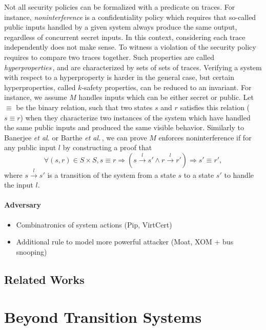 \documentclass[oneside,a4paper]{memoir}
\theoremstyle{break}
\begin{document}
Not all security policies can be formalized with a predicate on traces.
%
For instance, \emph{noninterference}  is a confidentiality policy
which requires that so-called public inputs handled by a given system always
produce the same output, regardless of concurrent secret inputs.
%
In this context, considering each trace independently does not make sense.
%
To witness a violation of the security policy requires to compare two traces
together.
%
Such properties are called \emph{hyperproperties}\,\cite{marr2002hypertheading},
and are characterized by sets of sets of traces.
%
Verifying a system with respect to a hyperproperty is harder in the general
case, but certain hyperproperties, called \( k \)-safety properties, can be
reduced to an invariant.
%
For instance, we assume \( M \) handles inputs which can be either secret or
public.
%
Let \( \equiv \) be the binary relation, such that two states \( s \) and
\( r \) satisfies this relation (\( s \equiv r \)) when they characterize two
instances of the system which have handled the same public inputs and produced
the same visible behavior.
%
Similarly to Banerjee \emph{et al.}  or Barthe \emph{et al.}\,\cite{barthe2011virtcert1},
we can prove \( M \) enforces noninterference if for any public input \( l \) by
constructing a proof that
%
\[
  \forall (s, r) \in S \times S, s \equiv r \Rightarrow (s \xrightarrow{l} s'
  \wedge r \xrightarrow{l} r') \Rightarrow s' \equiv r',
\]
where \( s \xrightarrow{l} s' \) is a transition of the system from a state
\( s \) to a state \( s' \) to handle the input \( l \).


\paragraph{Adversary}
%
\begin{itemize}
\item Combinatronics of system actions (Pip, VirtCert)
\item Additional rule to model more powerful attacker (Moat, XOM + bus snooping)
\end{itemize}

\subsection{Related Works}

\section{Beyond Transition Systems}
\end{document}
